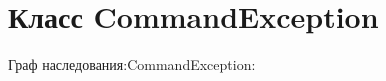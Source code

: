 \hypertarget{class_command_exception}{}\section{Класс Command\+Exception}
\label{class_command_exception}


Граф наследования\+:Command\+Exception\+:
